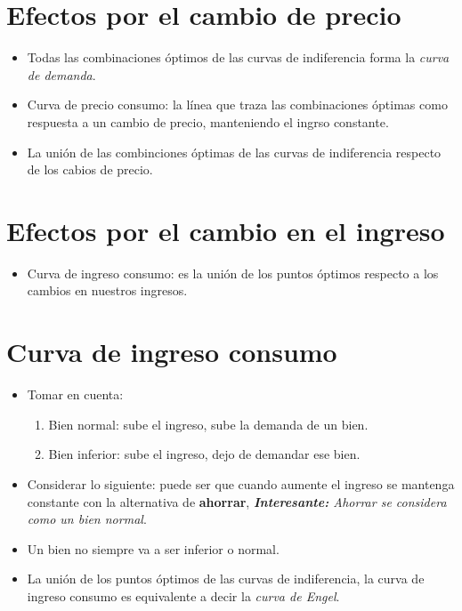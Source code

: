 
\section{Efectos por el cambio de precio}
\begin{itemize}
    \item Todas las combinaciones óptimos de las curvas de indiferencia forma la \emph{curva de demanda}.
    \item Curva de precio consumo: la línea que traza las combinaciones óptimas como respuesta a un cambio de precio, manteniendo el ingrso constante. 
    \item La unión de las combinciones óptimas de las curvas de indiferencia respecto de los cabios de precio.
\end{itemize}


\section{Efectos por el cambio en el ingreso}
\begin{itemize}
    \item Curva de ingreso consumo: es la unión de los puntos óptimos respecto a los cambios en nuestros ingresos.
\end{itemize}



\section{Curva de ingreso consumo}
\begin{itemize}
    \item Tomar en cuenta:
        \begin{enumerate}
            \item Bien normal: sube el ingreso, sube la demanda de un bien.
            \item Bien inferior: sube el ingreso, dejo de demandar ese bien.
        \end{enumerate}
    
    \item Considerar lo siguiente: puede ser que cuando aumente el ingreso se mantenga constante con la alternativa de \textbf{ahorrar}, \emph{\textbf{Interesante:} Ahorrar se considera como un bien normal}.
    \item Un bien no siempre va a ser inferior o normal.
    \item La unión de los puntos óptimos de las curvas de indiferencia, la curva de ingreso consumo es equivalente a decir la \emph{curva de Engel}.
\end{itemize}

